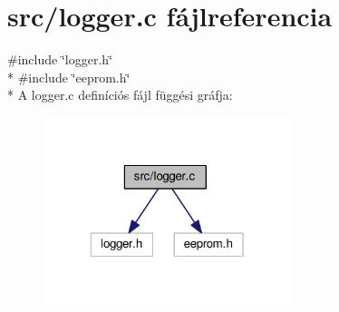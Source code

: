 \section{src/logger.c fájlreferencia}
\label{logger_8c}
{\ttfamily \#include \char`\"{}logger.\-h\char`\"{}}\\*
{\ttfamily \#include \char`\"{}eeprom.\-h\char`\"{}}\\*
A logger.\-c definíciós fájl függési gráfja\-:
\nopagebreak
\begin{figure}[H]
\begin{center}
\leavevmode
\includegraphics[width=205pt]{logger_8c__incl}
\end{center}
\end{figure}
